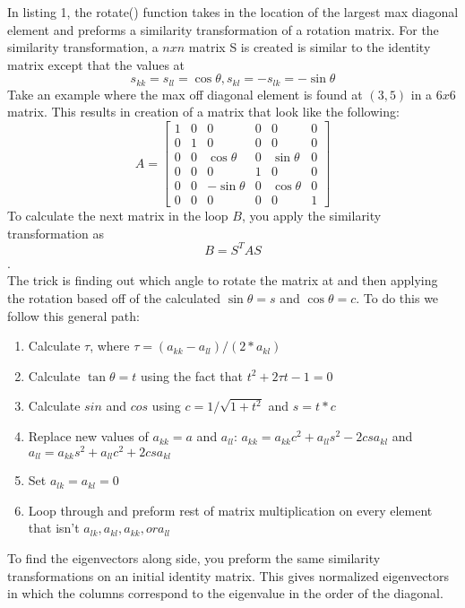 \documentclass[%
 reprint,
 amsmath,amssymb,
 aps,
]{revtex4-1}
\begin{document}
In listing 1, the rotate() function takes in the location of the largest max diagonal element and preforms a similarity transformation of a rotation matrix.  For the similarity transformation, a $nxn$ matrix S is created is similar to the identity matrix except that the values at
\[ s_{kk} = s_{ll} = \cos{\theta}, s_{kl} = -s_{lk} = -\sin{\theta} \]
Take an example where the max off diagonal element is found at $(3,5)$ in a $6x6$ matrix. This results in creation of a matrix that look like the following:
\[ A =
\begin{bmatrix}
    1 & 0 & 0 & 0 & 0 & 0 \\
    0 & 1 & 0 & 0 & 0  & 0 \\
    0 & 0 & \cos{\theta} & 0 & \sin{\theta}  & 0 \\
    0 & 0 & 0 & 1 & 0 & 0 \\
    0 & 0 & -\sin{\theta} & 0 & \cos{\theta} & 0 \\
    0 & 0 & 0 & 0 & 0 & 1
\end{bmatrix} \]
To calculate the next matrix in the loop $B$, you apply the similarity transformation as
\[ B = S^T A S \]. \\

The trick is finding out which angle to rotate the matrix at and then applying the rotation based off of the calculated $\sin{\theta} = s$ and $\cos{\theta} = c$. To do this we follow this general path: 
\begin{enumerate}
  \item Calculate $\tau$, where $\tau = (a_{kk}- a_{ll})/(2*a_{kl})$ 
  \item Calculate $\tan{\theta} = t$ using the fact that $t^2 +2\tau t - 1 = 0$
  \item Calculate $sin$ and $cos$ using $c = 1/\sqrt{1+t^2}$ and $s = t*c$
  \item Replace new values of $a_{kk}=a$ and $a_{ll}$: $a_{kk} = a_{kk}c^2 + a_{ll}s^2 - 2 c s a_{kl}$ and $a_{ll} = a_{kk}s^2 + a_{ll}c^2 + 2 c s a_{kl}$
  \item Set $a_{lk} = a_{kl} = 0$
  \item Loop through and preform rest of matrix multiplication on every element that isn't $a_{lk}, a_{kl}, a_{kk}, or a_{ll}$
\end{enumerate}

To find the eigenvectors along side, you preform the same similarity transformations on an initial identity matrix. This gives normalized eigenvectors in which the columns correspond to the eigenvalue in the order of the diagonal. 
\end{document}
